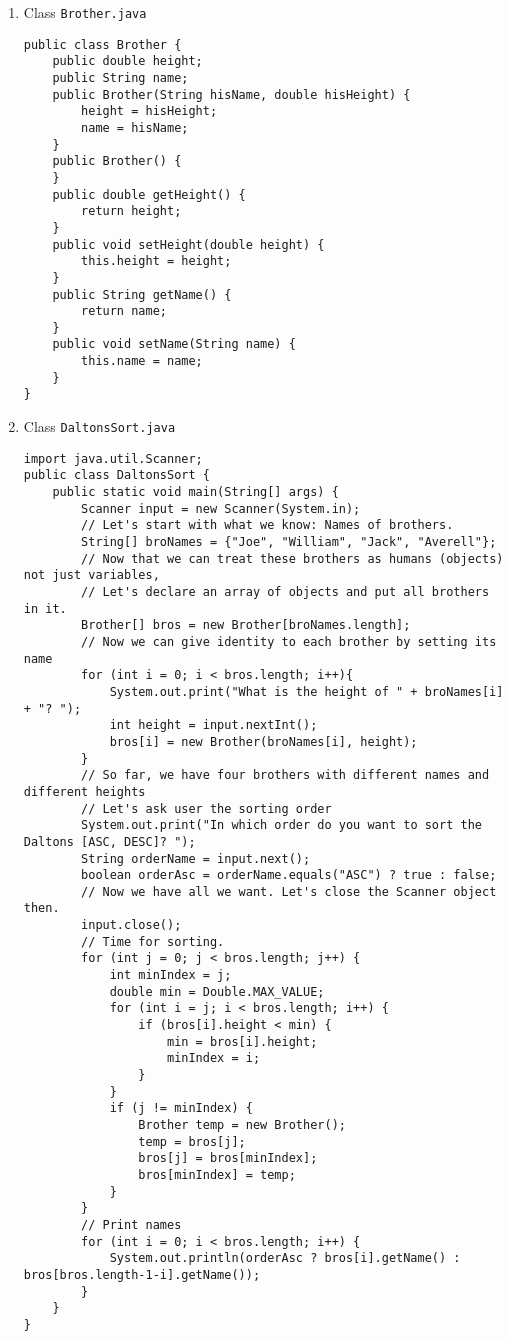 \documentclass[12pt,letterpaper,twoside]{article}
\begin{document}
\begin{enumerate}
\item Class \texttt{Brother.java}

\lstset{language=java,tabsize=2}
\begin{lstlisting}
public class Brother {
	public double height;
	public String name;
	public Brother(String hisName, double hisHeight) {
		height = hisHeight;
		name = hisName;
	}
	public Brother() {
	}
	public double getHeight() {
		return height;
	}
	public void setHeight(double height) {
		this.height = height;
	}
	public String getName() {
		return name;
	}
	public void setName(String name) {
		this.name = name;
	}
}
\end{lstlisting}

\item Class \texttt{DaltonsSort.java}
\lstset{language=java,tabsize=2}
\begin{lstlisting}
import java.util.Scanner;
public class DaltonsSort {
	public static void main(String[] args) {
		Scanner input = new Scanner(System.in);
		// Let's start with what we know: Names of brothers.
		String[] broNames = {"Joe", "William", "Jack", "Averell"};
		// Now that we can treat these brothers as humans (objects) not just variables,
		// Let's declare an array of objects and put all brothers in it.
		Brother[] bros = new Brother[broNames.length];
		// Now we can give identity to each brother by setting its name
		for (int i = 0; i < bros.length; i++){
			System.out.print("What is the height of " + broNames[i] + "? ");
			int height = input.nextInt();
			bros[i] = new Brother(broNames[i], height);
		}
		// So far, we have four brothers with different names and different heights
		// Let's ask user the sorting order
		System.out.print("In which order do you want to sort the Daltons [ASC, DESC]? ");
		String orderName = input.next();
		boolean orderAsc = orderName.equals("ASC") ? true : false;
		// Now we have all we want. Let's close the Scanner object then.
		input.close();
		// Time for sorting.
		for (int j = 0; j < bros.length; j++) {
			int minIndex = j;
			double min = Double.MAX_VALUE;
			for (int i = j; i < bros.length; i++) {
				if (bros[i].height < min) {
					min = bros[i].height;
					minIndex = i;
				}
			}
			if (j != minIndex) {
				Brother temp = new Brother();
				temp = bros[j];
				bros[j] = bros[minIndex];
				bros[minIndex] = temp;
			}
		}
		// Print names
		for (int i = 0; i < bros.length; i++) {
			System.out.println(orderAsc ? bros[i].getName() : bros[bros.length-1-i].getName());
		}
	}
}
\end{lstlisting}
\end{enumerate}
\end{document}
